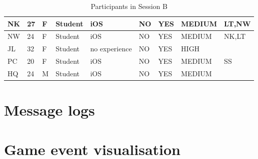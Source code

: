 \begin{table}[H]
{\begin{tabular}{|l|l|l|l|l|l|l|l|l|}
NK       & 27  & F      & Student    & iOS                                                             & NO                                                                 & YES                                                                  & MEDIUM                                                       & LT,NW                                                              \\ \hline
NW       & 24  & F      & Student    & iOS                                                             & NO                                                                 & YES                                                                  & MEDIUM                                                       & NK,LT                                                              \\ \hline
JL       & 32  & F      & Student    & no experience                                                   & NO                                                                 & YES                                                                  & HIGH                                                         &                                                                    \\ \hline
PC       & 20  & F      & Student    & iOS                                                             & NO                                                                 & YES                                                                  & MEDIUM                                                       & SS                                                                 \\ \hline
HQ       & 24  & M      & Student    & iOS                                                             & NO                                                                 & YES                                                                  & MEDIUM                                                       &                                                                    \\ \hline
\end{tabular}}
\caption{Participants in Session B}
\end{table}

\section{Message logs}

\section{Game event visualisation}

